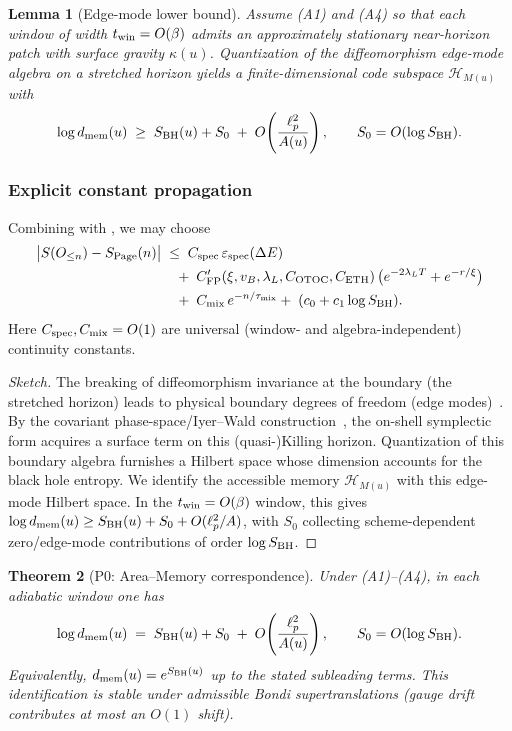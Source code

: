 \documentclass[11pt,a4paper]{article}
\theoremstyle{plain}
\newtheorem{theorem}{Theorem}
\newtheorem{lemma}[theorem]{Lemma}
\theoremstyle{definition}
\theoremstyle{remark}
\begin{document}
\label{sec:area-memory-evidence}
\begin{lemma}[Edge-mode lower bound]\label{lem:edge-lower}
Assume (A1) and (A4) so that each window of width $t_{\rm win}=O(\beta)$ admits an approximately stationary near-horizon patch with surface gravity $\kappa(u)$. Quantization of the diffeomorphism edge-mode algebra on a stretched horizon yields a finite-dimensional code subspace $\mathcal{H}_{M(u)}$ with
\[
\log d_{\rm mem}(u) \;\ge\; S_{\rm BH}(u) + S_0 \;+\; O\!\left(\frac{\ell_p^2}{A(u)}\right),
\qquad S_0=O(\log S_{\rm BH}).
\]
\end{lemma}

\subsubsection{Explicit constant propagation}
Combining  with , we may choose
\begin{equation}
\label{eq:budget-constants}
\begin{split}
\big|S(O_{\le n})-S_{\rm Page}(n)\big| 
&\;\le\; C_{\rm spec}\,\varepsilon_{\rm spec}(\Delta E) \\
&\quad+\; C'_{\mathrm{FP}}(\xi,v_B,\lambda_L,C_{\mathrm{OTOC}},C_{\mathrm{ETH}})\,
\big( e^{-2\lambda_L T} + e^{-r/\xi} \big) \\
&\quad+\; C_{\rm mix}\,e^{-n/\tau_{\rm mix}}
+\;(c_0+c_1\log S_{\rm BH}).
\end{split}
\end{equation}
Here $C_{\rm spec},C_{\rm mix}=O(1)$ are universal (window- and algebra-independent) continuity constants.
\begin{proof}[Sketch]
The breaking of diffeomorphism invariance at the boundary (the stretched horizon) leads to physical boundary degrees of freedom (edge modes)~\cite{Carlip:1995,DonnellyFreidel:2016}. By the covariant phase-space/Iyer--Wald construction~\cite{IyerWald:1994}, the on-shell symplectic form acquires a surface term on this (quasi-)Killing horizon. Quantization of this boundary algebra furnishes a Hilbert space whose dimension accounts for the black hole entropy. We identify the accessible memory $\mathcal{H}_{M(u)}$ with this edge-mode Hilbert space. In the $t_{\rm win}=O(\beta)$ window, this gives $\log d_{\rm mem}(u)\ge S_{\rm BH}(u)+S_0+O(\ell_p^2/A)$, with $S_0$ collecting scheme-dependent zero/edge-mode contributions of order $\log S_{\rm BH}$.
\end{proof}\begin{theorem}[P0: Area--Memory correspondence]\label{thm:P0}\label{app:area-memory}
Under (A1)--(A4), in each adiabatic window one has
\[
\log d_{\rm mem}(u) \;=\; S_{\rm BH}(u) + S_0 \;+\; O\!\left(\frac{\ell_p^2}{A(u)}\right),
\qquad S_0 = O(\log S_{\rm BH}) .
\]
Equivalently, $d_{\rm mem}(u)=e^{S_{\rm BH}(u)}$ up to the stated subleading terms. This identification is stable under admissible Bondi supertranslations (gauge drift contributes at most an $O(1)$ shift).
\end{theorem}
\end{document}

